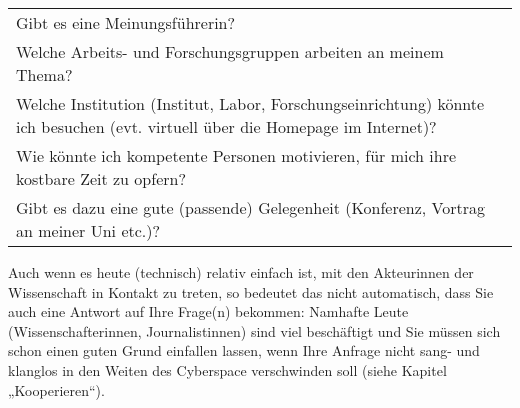 \documentclass[]{article}
\begin{document}
\begin{longtable}[]{@{}lc@{}}
\begin{minipage}[t]{0.66\columnwidth}\raggedright\strut
Gibt es eine Meinungsführerin?\strut
\end{minipage} & \begin{minipage}[t]{0.28\columnwidth}\centering\strut
\strut
\end{minipage}\tabularnewline
\begin{minipage}[t]{0.66\columnwidth}\raggedright\strut
Welche Arbeits- und Forschungsgruppen arbeiten an meinem Thema?\strut
\end{minipage} & \begin{minipage}[t]{0.28\columnwidth}\centering\strut
\strut
\end{minipage}\tabularnewline
\begin{minipage}[t]{0.66\columnwidth}\raggedright\strut
Welche Institution (Institut, Labor, Forschungseinrichtung) könnte ich
besuchen (evt. virtuell über die Homepage im Internet)?\strut
\end{minipage} & \begin{minipage}[t]{0.28\columnwidth}\centering\strut
\strut
\end{minipage}\tabularnewline
\begin{minipage}[t]{0.66\columnwidth}\raggedright\strut
Wie könnte ich kompetente Personen motivieren, für mich ihre kostbare
Zeit zu opfern?\strut
\end{minipage} & \begin{minipage}[t]{0.28\columnwidth}\centering\strut
\strut
\end{minipage}\tabularnewline
\begin{minipage}[t]{0.66\columnwidth}\raggedright\strut
Gibt es dazu eine gute (passende) Gelegenheit (Konferenz, Vortrag an
meiner Uni etc.)?\strut
\end{minipage} & \begin{minipage}[t]{0.28\columnwidth}\centering\strut
\strut
\end{minipage}\tabularnewline
\bottomrule
\end{longtable}

Auch wenn es heute (technisch) relativ einfach ist, mit den Akteurinnen
der Wissenschaft in Kontakt zu treten, so bedeutet das nicht
automatisch, dass Sie auch eine Antwort auf Ihre Frage(n) bekommen:
Namhafte Leute (Wissenschafterinnen, Journalistinnen) sind viel
beschäftigt und Sie müssen sich schon einen guten Grund einfallen
lassen, wenn Ihre Anfrage nicht sang- und klanglos in den Weiten des
Cyberspace verschwinden soll (siehe Kapitel „Kooperieren``).
\end{document}
